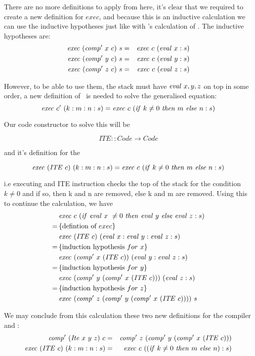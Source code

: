 \documentclass {article}
\begin{document}
There are no more definitions to apply from here,
it's clear that we required to
create a new definition for $exec$,
and because this is an inductive calculation
we can use the inductive hypotheses
just like with \BH's calculation of \add.
The inductive hypotheses are:
\begin{eqnarray*}
	\mathit{exec\ } (\mathit{comp'\ }  x\ c)\ s &=& \mathit{exec\ } c\ (\mathit{eval\ } x:s) \\
	\mathit{exec\ } (\mathit{comp'\ }  y\ c)\ s &=& \mathit{exec\ } c\ (\mathit{eval\ } y:s) \\
	\mathit{exec\ } (\mathit{comp'\ }  z\ c)\ s &=& \mathit{exec\ } c\ (\mathit{eval\ } z:s)
\end{eqnarray*}

However, to be able to use them,
the stack must have 
$\mathit{eval\ } x,y,z$ on top in some order,
a new definition of \exec\ is needed to 
solve the generalised equation:
\[ \mathit{exec\ } c'\ (k:m:n:s) 
	= \mathit{exec\ } c\ (\mathit{if\ } k \not= 0\ \mathit{then\ } m\ \mathit{else\ }  n : s)\]

Our code constructor to solve this will be

\newcommand{\ITEt}{\textit{ITE\ }}
\newcommand{\ITE}{\mathit{ITE\ }}

	\[ ITE :: Code \rightarrow Code \]

and it's definition for the \vm

	\[ \Exec (\ITE c)\ (k:m:n:s) 
		= \Exec c\ (\ifff k \not= 0\ \tthen m\ \eelse n:s) \]

i.e executing and ITE instruction
checks the top of the stack for the condition $k \not= 0$
and if so, then k and n are removed,
else k and m are removed.
Using this to continue the calculation, we have
\begin{align*}
	&\Exec c\ (\ifff \evalf  x\ \not= 0\ \tthen \evalf  y\ \eelse \evalf  z :s) \\
	=\, & \{\mbox{defintion of}\ exec\} \\
	&\Exec (\ITE c)\ (\evalf  x:\evalf  y:\evalf  z:s) \\
	=\, & \{\mbox{induction hypothesis}\ for\ x\} \\
	&\Exec (\Compp  x\ (\ITE c))\ (\evalf  y:\evalf  z:s) \\
	=\, & \{\mbox{induction hypothesis}\ for\ y\} \\
	&\Exec (\Compp  y\ (\Compp  x\ (\ITE c)))\ (\evalf  z:s) \\
	=\, & \{\mbox{induction hypothesis}\ for\ z\} \\
	&\Exec (\Compp  z\ (\Compp  y\ (\Compp  x\ (\ITE c))))\ s
\end{align*}

We may conclude from this calculation these two new definitions
for the compiler and \vm: 
\begin{eqnarray}
	\Compp  (\Ite x\ y\ z)\ c &=&  \Compp  z\ (\Compp  y\ (\Compp  x\ (\ITE c))) \label{compite}\\
	\Exec (\ITE c)\ (k:m:n:s) &=& \Exec c\ ((\ifff k \not= 0\ \tthen m\ \eelse n):s) \label{execite}
\end{eqnarray}
\end{document}
